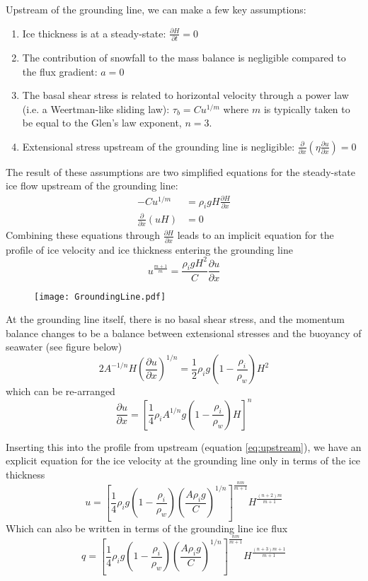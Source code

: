 \documentclass[12pt]{article}
\theoremstyle{definition}
\newcommand{\pd}[2]{\frac{\partial {#1}}{\partial {#2}}}
\begin{document}
Upstream of the grounding line, we can make a few key assumptions:
\begin{enumerate}
\item Ice thickness is at a steady-state: $\pd{H}{t} = 0$
\item The contribution of snowfall to the mass balance is negligible compared to the flux gradient: $a=0$
\item The basal shear stress is related to horizontal velocity through a power law (i.e. a Weertman-like sliding law): $\tau_b = Cu^{1/m}$ where $m$ is typically taken to be equal to the Glen's law exponent, $n=3$.
\item Extensional stress upstream of the grounding line is negligible: $\pd{}{x} \left( \eta \pd{u}{x} \right) = 0$
\end{enumerate}
The result of these assumptions are two simplified equations for the steady-state ice flow upstream of the grounding line:
\begin{align}
- Cu^{1/m} &= \rho_i g H \pd{H}{x} \\
\pd{}{x} \left(u H \right) &= 0
\end{align}
Combining these equations through $\pd{H}{x}$ leads to an implicit equation for the profile of ice velocity and ice thickness entering the grounding line
\begin{equation}
\label{eq:upstream}
u^{\frac{m+1}{m}} = \frac{\rho_i g H^2}{C} \pd{u}{x}
\end{equation}
\begin{figure}[h]
  \begin{center}
\texttt{[image: GroundingLine.pdf]}
  \end{center}
\end{figure}
At the grounding line itself, there is no basal shear stress, and the momentum balance changes to be a balance between extensional stresses and the buoyancy of seawater (see figure below)
\begin{equation}
2 A^{-1/n} H \left(\pd{u}{x} \right)^{1/n} = \frac{1}{2} \rho_i g \left(1 - \frac{\rho_i}{\rho_w} \right) H^2
\end{equation}
which can be re-arranged
\begin{equation}
\pd{u}{x} = \left[\frac{1}{4} \rho_i A^{1/n} g \left(1 - \frac{\rho_i}{\rho_w} \right) H \right]^n
\end{equation}
\begin{shaded}
Inserting this into the profile from upstream (equation \ref{eq:upstream}), we have an explicit equation for the ice velocity at the grounding line only in terms of the ice thickness
\begin{equation}
u = \left[\frac{1}{4} \rho_i g \left(1 - \frac{\rho_i}{\rho_w} \right) \left(\frac{A \rho_i g}{C} \right)^{1/n} \right]^{\frac{nm}{m+1}} H^{\frac{(n+2)m}{m+1}}
\end{equation}
Which can also be written in terms of the grounding line ice flux
\begin{equation}
q = \left[\frac{1}{4} \rho_i g \left(1 - \frac{\rho_i}{\rho_w} \right) \left(\frac{A \rho_i g}{C} \right)^{1/n} \right]^{\frac{nm}{m+1}} H^{\frac{(n+3)m+1}{m+1}}
\end{equation}
\end{shaded}
\end{document}
